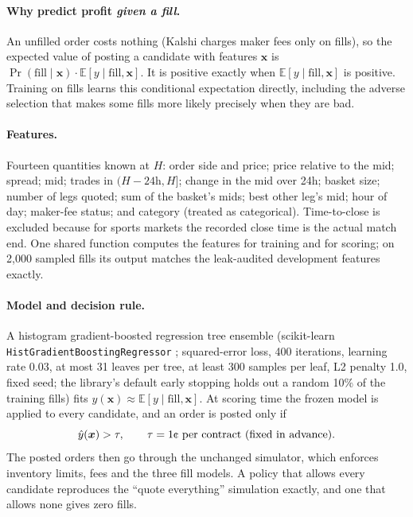 \documentclass[11pt,a4paper]{article}
\newcommand{\cent}{\text{\textcent}}
\begin{document}
\paragraph{Why predict profit \emph{given a fill}.} An unfilled order costs nothing (Kalshi charges maker fees only on
fills), so the expected value of posting a candidate with features $\bm{x}$ is
$\Pr(\text{fill}\mid\bm{x})\cdot\mathbb{E}[y\mid\text{fill},\bm{x}]$. It is positive exactly when
$\mathbb{E}[y\mid\text{fill},\bm{x}]$ is positive. Training on fills learns this conditional expectation directly,
including the adverse selection that makes some fills more likely precisely when they are bad.

\paragraph{Features.} Fourteen quantities known at $H$: order side and price; price relative to the mid; spread; mid;
trades in $(H-24\text{h}, H]$; change in the mid over 24h; basket size; number of legs quoted; sum of the basket's
mids; best other leg's mid; hour of day; maker-fee status; and category (treated as categorical). Time-to-close is
excluded because for sports markets the recorded close time is the actual match end. One shared function computes the
features for training and for scoring; on 2{,}000 sampled fills its output matches the leak-audited development
features exactly.

\paragraph{Model and decision rule.} A histogram gradient-boosted regression tree ensemble \cite{ke2017lightgbm}
(scikit-learn \texttt{HistGradient\allowbreak{}Boosting\allowbreak{}Regressor} \cite{pedregosa2011}; squared-error
loss, 400 iterations, learning rate 0.03, at most 31 leaves per tree, at least 300 samples per leaf, L2 penalty 1.0,
fixed seed; the library's default early stopping holds out a random 10\% of the training fills) fits
$\hat y(\bm{x})\approx\mathbb{E}[y\mid\text{fill},\bm{x}]$. At scoring time the frozen model is applied to every
candidate, and an order is posted only if
\begin{equation}
  \hat y(\bm{x}) > \tau, \qquad \tau = 1\cent \text{ per contract (fixed in advance).}
\end{equation}
The posted orders then go through the unchanged simulator, which enforces inventory limits, fees and the three fill
models. A policy that allows every candidate reproduces the ``quote everything'' simulation exactly, and one that
allows none gives zero fills.
\end{document}
